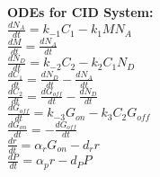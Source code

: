 \documentclass[11pt,oneside]{article}
\theoremstyle{changebreak}
\begin{document}
 \textbf{ODEs for CID System:} \\
 
 $\frac{dN_{A}}{dt} = k_{-1}C_{1} -k_{1}MN_{A}$\\
 
 $\frac{dM}{dt} = \frac{dN_{A}}{dt}$ \\
 
 $\frac{dN_{D}}{dt} = k_{-2}C_{2} - k_{2}C_{1}N_{D}$\\
 
 $\frac{dC_{1}}{dt} =  \frac{dN_{D}}{dt}-\frac{dN_{A}}{dt}$\\
 
 $\frac{dC_{2}}{dt} =  \frac{dG_{off}}{dt} -\frac{dN_{D}}{dt}$\\
 
$\frac{dG_{off}}{dt} = k_{-3}G_{on} - k_{3}C_{2}G_{off}$ \\ 
 
 $\frac{dG_{on}}{dt} = -\frac{dG_{off}}{dt}$\\
 
 $\frac{dr}{dt} = \alpha_{r}G_{on} - d_{r}r$\\
 
 $\frac{dP}{dt} = \alpha_{p}r - d_{P}P$ \\
 
 

\end{document}
